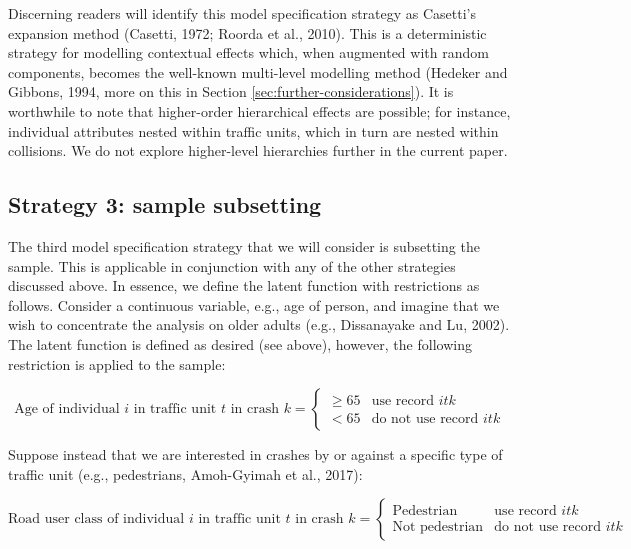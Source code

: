 \documentclass[]{elsarticle} %
\begin{document}
Discerning readers will identify this model specification strategy as
Casetti's expansion method (Casetti, 1972; Roorda et al., 2010). This is
a deterministic strategy for modelling contextual effects which, when
augmented with random components, becomes the well-known multi-level
modelling method (Hedeker and Gibbons, 1994, more on this in Section
\ref{sec:further-considerations}). It is worthwhile to note that
higher-order hierarchical effects are possible; for instance, individual
attributes nested within traffic units, which in turn are nested within
collisions. We do not explore higher-level hierarchies further in the
current paper.

\hypertarget{strategy-3-sample-subsetting}{%
\subsection{Strategy 3: sample
subsetting}\label{strategy-3-sample-subsetting}}

The third model specification strategy that we will consider is
subsetting the sample. This is applicable in conjunction with any of the
other strategies discussed above. In essence, we define the latent
function with restrictions as follows. Consider a continuous variable,
e.g., age of person, and imagine that we wish to concentrate the
analysis on older adults (e.g., Dissanayake and Lu, 2002). The latent
function is defined as desired (see above), however, the following
restriction is applied to the sample:

\begin{equation}
\label{eq:sampling-age}
\text{Age of individual } i \text{ in traffic unit } t \text{ in crash } k = 
\begin{cases}
\ge 65 & \text{use record } itk\\
< 65 & \text{do not use record } itk
\end{cases}
\end{equation}

Suppose instead that we are interested in crashes by or against a
specific type of traffic unit (e.g., pedestrians, Amoh-Gyimah et al.,
2017):

\begin{equation}
\label{eq:sampling-pedestrian}
\text{Road user class of individual } i \text{ in traffic unit } t \text{ in crash } k = 
\begin{cases}
\text{Pedestrian} & \text{use record } itk\\
\text{Not pedestrian} & \text{do not use record } itk
\end{cases}
\end{equation}
\end{document}
